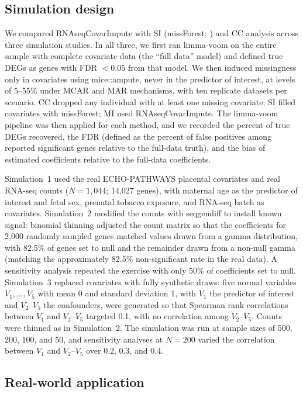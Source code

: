 \documentclass[11pt]{article}
\begin{document}
\subsection{Simulation design}

We compared RNAseqCovarImpute with SI (missForest; \citealp{stekhoven2012missforest}) and CC analysis across three simulation studies. In all three, we first ran limma-voom on the entire sample with complete covariate data (the ``full data'' model) and defined true DEGs as genes with FDR $<0.05$ from that model. We then induced missingness only in covariates using mice::ampute, never in the predictor of interest, at levels of 5--55\% under MCAR and MAR mechanisms, with ten replicate datasets per scenario. CC dropped any individual with at least one missing covariate; SI filled covariates with missForest; MI used RNAseqCovarImpute. The limma-voom pipeline was then applied for each method, and we recorded the percent of true DEGs recovered, the FDR (defined as the percent of false positives among reported significant genes relative to the full-data truth), and the bias of estimated coefficients relative to the full-data coefficients.

Simulation~1 used the real ECHO-PATHWAYS placental covariates and real RNA-seq counts ($N=1{,}044$; 14,027 genes), with maternal age as the predictor of interest and fetal sex, prenatal tobacco exposure, and RNA-seq batch as covariates. Simulation~2 modified the counts with seqgendiff \citep{gerard2020data} to install known signal: binomial thinning adjusted the count matrix so that the coefficients for 2,000 randomly sampled genes matched values drawn from a gamma distribution, with 82.5\% of genes set to null and the remainder drawn from a non-null gamma (matching the approximately 82.5\% non-significant rate in the real data). A sensitivity analysis repeated the exercise with only 50\% of coefficients set to null. Simulation~3 replaced covariates with fully synthetic draws: five normal variables $V_1,\dots,V_5$ with mean 0 and standard deviation 1, with $V_1$ the predictor of interest and $V_2$--$V_5$ the confounders, were generated so that Spearman rank correlations between $V_1$ and $V_2$--$V_5$ targeted 0.1, with no correlation among $V_2$--$V_5$. Counts were thinned as in Simulation~2. The simulation was run at sample sizes of 500, 200, 100, and 50, and sensitivity analyses at $N=200$ varied the correlation between $V_1$ and $V_2$--$V_5$ over 0.2, 0.3, and 0.4.

\subsection{Real-world application}
\end{document}
